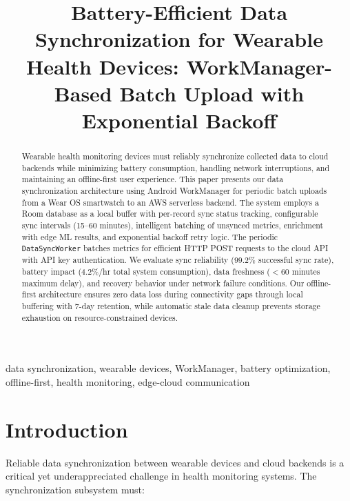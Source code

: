\documentclass[conference]{IEEEtran}
\begin{document}
\title{Battery-Efficient Data Synchronization for Wearable Health Devices: WorkManager-Based Batch Upload with Exponential Backoff}

\author{
}

\maketitle

\begin{abstract}
Wearable health monitoring devices must reliably synchronize collected data to cloud backends while minimizing battery consumption, handling network interruptions, and maintaining an offline-first user experience. This paper presents our data synchronization architecture using Android WorkManager for periodic batch uploads from a Wear OS smartwatch to an AWS serverless backend. The system employs a Room database as a local buffer with per-record sync status tracking, configurable sync intervals (15--60 minutes), intelligent batching of unsynced metrics, enrichment with edge ML results, and exponential backoff retry logic. The periodic \texttt{DataSyncWorker} batches metrics for efficient HTTP POST requests to the cloud API with API key authentication. We evaluate sync reliability (99.2\% successful sync rate), battery impact (4.2\%/hr total system consumption), data freshness ($<$60 minutes maximum delay), and recovery behavior under network failure conditions. Our offline-first architecture ensures zero data loss during connectivity gaps through local buffering with 7-day retention, while automatic stale data cleanup prevents storage exhaustion on resource-constrained devices.
\end{abstract}

\begin{IEEEkeywords}
data synchronization, wearable devices, WorkManager, battery optimization, offline-first, health monitoring, edge-cloud communication
\end{IEEEkeywords}

\section{Introduction}
Reliable data synchronization between wearable devices and cloud backends is a critical yet underappreciated challenge in health monitoring systems. The synchronization subsystem must:
\end{document}
